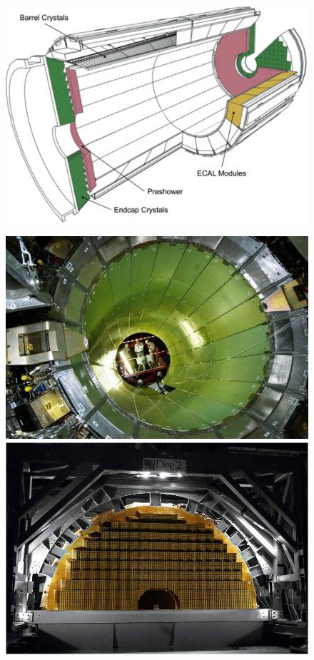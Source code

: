 \begin{figure}[htbp]
	\centering
	\begin{minipage}{0.5\linewidth}
		\includegraphics[width=\linewidth]{2_ExperimentalSetup/Figures/imageedit_5_8264930617}
	\end{minipage}
\begin{minipage}{0.39\linewidth}
	\includegraphics[width=\linewidth]{2_ExperimentalSetup/Figures/ECAL}
	\includegraphics[width=\linewidth]{2_ExperimentalSetup/Figures/EE-in-frame}

\end{minipage}
\end{figure}
